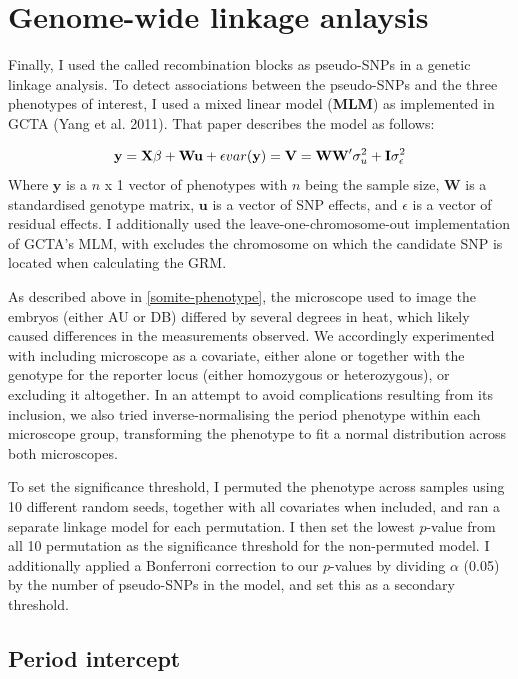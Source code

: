 \documentclass[
]{book}
\begin{document}
\hypertarget{genome-wide-linkage-anlaysis}{%
\section{Genome-wide linkage anlaysis}\label{genome-wide-linkage-anlaysis}}

Finally, I used the called recombination blocks as pseudo-SNPs in a genetic linkage analysis. To detect associations between the pseudo-SNPs and the three phenotypes of interest, I used a mixed linear model (\textbf{MLM}) as implemented in GCTA (Yang et al. 2011). That paper describes the model as follows:

\[
\textbf{y} = \textbf{X}\beta + \textbf{Wu} + \epsilon \\
var(\textbf{y}) = \textbf{V} = \textbf{WW}'\sigma^2_{u} + \textbf{I}\sigma_{\epsilon}^2
\]
Where \(\textbf{y}\) is a \(n\) x 1 vector of phenotypes with \(n\) being the sample size, \(\textbf{W}\) is a standardised genotype matrix, \(\textbf{u}\) is a vector of SNP effects, and \(\epsilon\) is a vector of residual effects. I additionally used the leave-one-chromosome-out implementation of GCTA's MLM, with excludes the chromosome on which the candidate SNP is located when calculating the GRM.

As described above in \ref{somite-phenotype}, the microscope used to image the embryos (either AU or DB) differed by several degrees in heat, which likely caused differences in the measurements observed. We accordingly experimented with including microscope as a covariate, either alone or together with the genotype for the reporter locus (either homozygous or heterozygous), or excluding it altogether. In an attempt to avoid complications resulting from its inclusion, we also tried inverse-normalising the period phenotype within each microscope group, transforming the phenotype to fit a normal distribution across both microscopes.

To set the significance threshold, I permuted the phenotype across samples using 10 different random seeds, together with all covariates when included, and ran a separate linkage model for each permutation. I then set the lowest \(p\)-value from all 10 permutation as the significance threshold for the non-permuted model. I additionally applied a Bonferroni correction to our \(p\)-values by dividing \(\alpha\) (0.05) by the number of pseudo-SNPs in the model, and set this as a secondary threshold.

\hypertarget{period-intercept}{%
\subsection{Period intercept}\label{period-intercept}}
\end{document}
